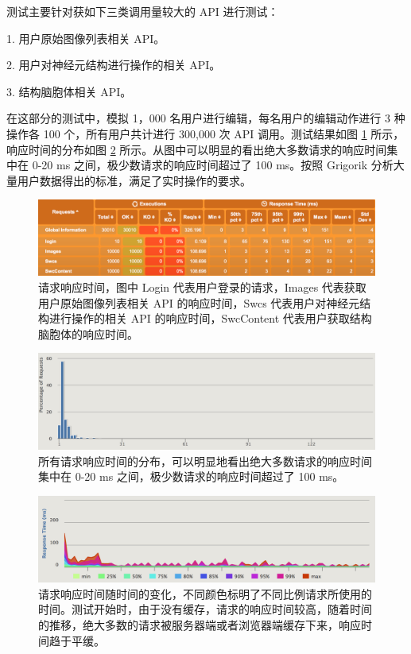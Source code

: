 测试主要针对获如下三类调用量较大的 API 进行测试：

1. 用户原始图像列表相关 API。

2. 用户对神经元结构进行操作的相关 API。

3. 结构脑胞体相关 API。

在这部分的测试中，模拟 1，000 名用户进行编辑，每名用户的编辑动作进行 3 种操作各 100 个，所有用户共计进行 300,000 次 API 调用。测试结果如图 \ref{response} 所示，响应时间的分布如图 \ref{responsedis} 所示。从图中可以明显的看出绝大多数请求的响应时间集中在 0-20 ms 之间，极少数请求的响应时间超过了 100 ms。按照 Grigorik 分析大量用户数据得出的标准，满足了实时操作的要求。

\begin{figure}[!ht]
\centering
\includegraphics[width=148mm]{images/response}
\caption{请求响应时间，图中 Login 代表用户登录的请求，Images 代表获取用户原始图像列表相关 API 的响应时间，Swcs 代表用户对神经元结构进行操作的相关 API 的响应时间，SwcContent 代表用户获取结构脑胞体的响应时间。}
\label{response}
\end{figure}

\begin{figure}[!ht]
\centering
\includegraphics[width=148mm]{images/responsedis}
\caption{所有请求响应时间的分布，可以明显地看出绝大多数请求的响应时间集中在 0-20 ms 之间，极少数请求的响应时间超过了 100 ms。}
\label{responsedis}
\end{figure}

\begin{figure}[!ht]
\centering
\includegraphics[width=148mm]{images/responsetime}
\caption{请求响应时间随时间的变化，不同颜色标明了不同比例请求所使用的时间。测试开始时，由于没有缓存，请求的响应时间较高，随着时间的推移，绝大多数的请求被服务器端或者浏览器端缓存下来，响应时间趋于平缓。}
\label{responsetime}
\end{figure}

